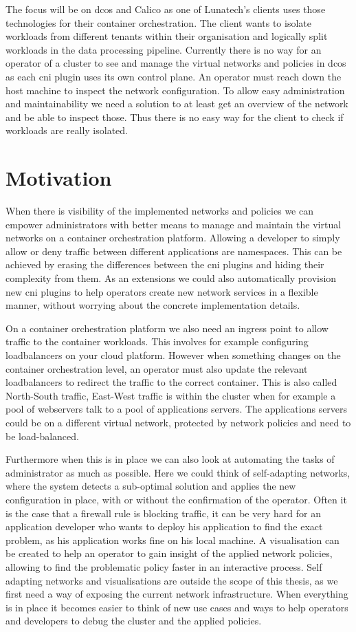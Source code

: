 The focus will be on \gls{dcos} and Calico as one of Lunatech's clients uses those technologies for their container orchestration. The client wants to isolate workloads from different tenants within their organisation and logically split workloads in the data processing pipeline. Currently there is no way for an operator of a cluster to see and manage the virtual networks and policies in \gls{dcos} as each \gls{cni} plugin uses its own control plane. An operator must reach down the host machine to inspect the network configuration. To allow easy administration and maintainability we need a solution to at least get an overview of the network and be able to inspect those. Thus there is no easy way for the client to check if workloads are really isolated. 
\section{Motivation}
When there is visibility of the implemented networks and policies we can empower administrators with better means to manage and maintain the virtual networks on a container orchestration platform. Allowing a developer to simply allow or deny traffic between different applications are namespaces. This can be achieved by erasing the differences between the \gls{cni} plugins and hiding their complexity from them. As an extensions we could also automatically provision new \gls{cni} plugins to help operators create new network services in a flexible manner, without worrying about the concrete implementation details.

On a container orchestration platform we also need an ingress point to allow traffic to the container workloads. This involves for example configuring loadbalancers on your cloud platform. However when something changes on the container orchestration level, an operator must also update the relevant loadbalancers to redirect the traffic to the correct container. This is also called North-South traffic, East-West traffic is within the cluster when for example a pool of webservers talk to a pool of applications servers. The applications servers could be on a different virtual network, protected by network policies and need to be load-balanced.

Furthermore when this is in place we can also look at automating the tasks of administrator as much as possible. Here we could think of self-adapting networks, where the system detects a sub-optimal solution and applies the new configuration in place, with or without the confirmation of the operator. Often it is the case that a firewall rule is blocking traffic, it can be very hard for an application developer who wants to deploy his application to find the exact problem, as his application works fine on his local machine. A visualisation can be created to help an operator to gain insight of the applied network policies, allowing to find the problematic policy faster in an interactive process. Self adapting networks and visualisations are outside the scope of this thesis, as we first need a way of exposing the current network infrastructure. When everything is in place it becomes easier to think of new use cases and ways to help operators and developers to debug the cluster and the applied policies.


